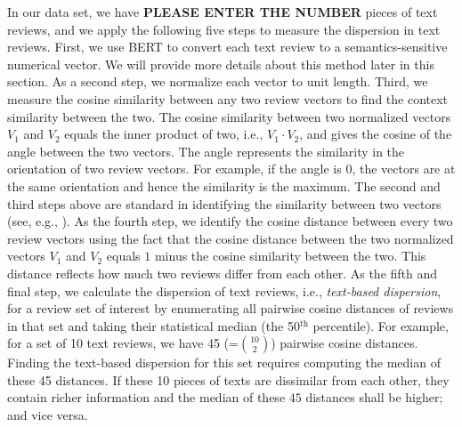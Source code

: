 \documentclass[msom,blindrev]{informs3}
\begin{document}
In our data set, we have \textbf{PLEASE ENTER THE NUMBER} pieces of text reviews, and we apply the following five steps to measure the dispersion in text reviews. First, we use BERT to convert each text review to a semantics-sensitive numerical vector. We will provide more details about this method later in this section.  As a second step, we normalize each vector to unit length. Third, we measure the cosine similarity between any two review vectors to find the context similarity between the two. The cosine similarity between two normalized vectors $V_{1}$ and $V_{2}$ equals the inner product of two, i.e., $V_1 \cdot V_2$, and gives the cosine of the angle between the two vectors. The angle represents the similarity in the orientation of two review vectors. For example, if the angle is $0$, the vectors are at the same orientation and hence the similarity is the maximum. The second and third steps above are standard in identifying the similarity between two vectors (see, e.g., \cite{hoberg2016text}). As the fourth step, we identify the cosine distance between every two review vectors using the fact that the cosine distance between the two normalized vectors $V_{1}$ and $V_{2}$ equals $1$ minus the cosine similarity between the two. This distance reflects how much two reviews differ from each other. As the fifth and final step, we calculate the dispersion of text reviews, i.e., \emph{text-based dispersion}, for a review set of interest by enumerating all pairwise cosine distances of reviews in that set and taking their statistical median (the 50$^{\text{th}}$ percentile). For example, for a set of 10 text reviews, we have 45 (=$\binom{10}{2}$) pairwise cosine distances. Finding the text-based dispersion for this set requires computing the median of these 45 distances. If these 10 pieces of texts are dissimilar from each other, they contain richer information and the median of these $45$ distances shall be higher; and vice versa.
\end{document}
